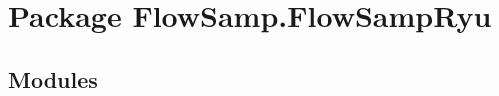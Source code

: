 %
%
%


\section{Package FlowSamp.FlowSampRyu}

    \label{FlowSamp:FlowSampRyu}


\subsection{Modules}

